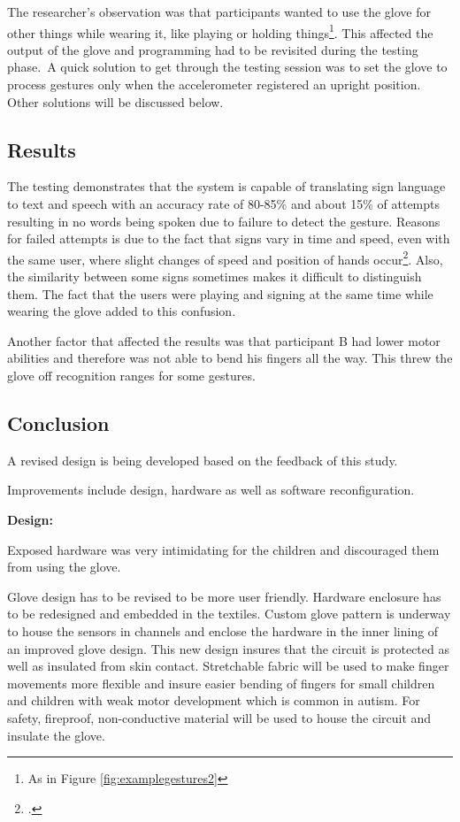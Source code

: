 The researcher's observation was that participants wanted to use the glove for other things while wearing it, like playing or holding things\footnote{As in Figure \ref{fig:examplegestures2}}. This affected the output of the glove and programming had to be revisited during the testing phase. A quick solution to get through the testing session was to set the glove to process gestures only when the accelerometer registered an upright position. Other solutions will be discussed below. 

\subsection{Results}

The testing demonstrates that the system is capable of translating sign language to text and speech with an accuracy rate of 80-85\% and about 15\% of attempts resulting in no words being spoken due to failure to detect the gesture. Reasons for failed attempts is due to the fact that signs vary in time and speed, even with the same user, where slight changes of speed and position of hands occur\footcite{Premaratne2010}. Also, the similarity between some signs sometimes makes it difficult to distinguish them. The fact that the users were playing and signing at the same time while wearing the glove added to this confusion. 

Another factor that affected the results was that participant B had lower motor abilities and therefore was not able to bend his fingers all the way. This threw the glove off recognition ranges for some gestures.

\subsection{Conclusion}

A revised design is being developed based on the feedback of this study. 

Improvements include design, hardware as well as software reconfiguration. 

\textbf{Design:}

Exposed hardware was very intimidating for the children and discouraged them from using the glove.

Glove design has to be revised to be more user friendly. Hardware enclosure has to be redesigned and embedded in the textiles. Custom glove pattern is underway to house the sensors in channels and enclose the hardware in the inner lining of an improved glove design. This new design insures that the circuit is protected as well as insulated from skin contact. Stretchable fabric will be used to make finger movements more flexible and insure easier bending of fingers for small children and children with weak motor development which is common in autism. For safety, fireproof, non-conductive material will be used to house the circuit and insulate the glove.

